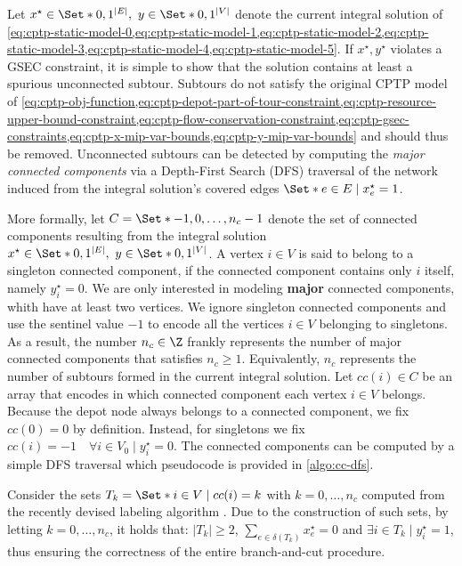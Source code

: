 Let $x^\star \in \Set*{0, 1}^{|E|},\ y \in \Set*{0, 1}^{|V|}$ denote the
current integral solution of
\cref{eq:cptp-static-model-0,eq:cptp-static-model-1,eq:cptp-static-model-2,eq:cptp-static-model-3,eq:cptp-static-model-4,eq:cptp-static-model-5}.
If $x^\star, y^\star$ violates a GSEC constraint,
it is simple to show that the solution contains at least a spurious unconnected subtour.
Subtours do not satisfy the original CPTP model of
\cref{eq:cptp-obj-function,eq:cptp-depot-part-of-tour-constraint,eq:cptp-resource-upper-bound-constraint,eq:cptp-flow-conservation-constraint,eq:cptp-gsec-constraints,eq:cptp-x-mip-var-bounds,eq:cptp-y-mip-var-bounds}
and should thus be removed.
Unconnected subtours can be detected
by computing the \textit{major connected components}
via a Depth-First Search (DFS) traversal
of the network induced from the integral solution's covered edges $\Set*{e \in E \mid x^\star_e = 1}$.

\medskip

More formally,
let $C = \Set*{-1, 0, \dots, n_c - 1}$ denote the set of connected components
resulting from the integral solution $x^\star \in \Set*{0, 1}^{|E|},\ y \in \Set*{0, 1}^{|V|}$.
A vertex $i \in V$ is said to belong to a singleton connected component,
if the connected component contains only $i$ itself, namely $y^\star_i = 0$.
We are only interested in modeling \textbf{major} connected components,
whith have at least two vertices.
We ignore singleton connected components
and use the sentinel value $-1$ to encode all the vertices $i \in V$ belonging to singletons.
As a result, the number $n_c \in \Z$ frankly represents the number
of major connected components that satisfies $n_c \ge 1$.
Equivalently,
$n_c$ represents the number of subtours formed in the current integral solution.
Let $cc(i) \in C$ be an array
that encodes in which connected component each vertex $i \in V$ belongs.
Because the depot node always belongs to a connected component, we fix $cc(0) = 0$ by definition.
Instead, for singletons we fix $cc(i) = -1  \quad \forall i \in V_0 \mid y^\star_i = 0$.
The connected components can be computed
by a simple DFS traversal which pseudocode is provided in \cref{algo:cc-dfs}.

Consider the sets $T_k = \Set*{i \in V \mid cc(i) = k}$ with $k = 0, \dots, n_c$
computed from the recently devised labeling algorithm .
Due to the construction of such sets,
by letting $k = 0, \dots, n_c$,
it holds that:
$|T_k| \ge 2$,
$\sum_{e \in \delta(T_k)} x^\star_e = 0$
and $\exists i \in T_k \mid y^\star_i = 1$,
thus ensuring the correctness of the entire branch-and-cut procedure.

